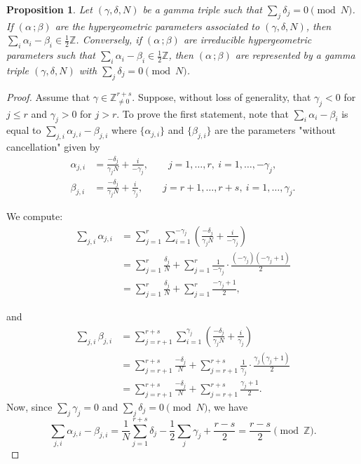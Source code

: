 \documentclass[11pt, reqno]{amsart}
\theoremstyle{plain}
\newtheorem{prop}[theo]{Proposition}
\theoremstyle{definition}
\newcommand{\Z}{\mathbb{Z}}
\newcommand{\ga}{\gamma}
\newcommand{\be}{\beta}
\newcommand{\al}{\alpha}
\begin{document}
\begin{prop}\label{prop:characterization-of-gamma-triple}
Let $(\gamma,\delta,N)$ be a gamma triple such that $\sum_{j} \delta_j =0 \pmod{N}$. If $(\al \,;\be)$ are the hypergeometric parameters associated to $(\gamma,\delta,N)$, then $\sum_{i} \al_i - \be_i \in \frac{1}{2} \Z$. 
Conversely, if $(\al \,;\be)$ are irreducible hypergeometric parameters such that $\sum_{i} \al_i - \be_i \in \frac{1}{2}\Z$, then $(\al \,;\be)$ are represented by a gamma triple $(\ga,\delta,N)$ with $\sum_{j} \delta_j=0 \pmod{N}$.
\end{prop}
\begin{proof}
Assume that $\ga \in \Z_{\neq0}^{r+s}$. Suppose, without loss of generality, that $\ga_j <0$ for $j\le r$ and $\ga_j> 0 $ for $j > r$.
To prove the first statement, note that $\sum_{i} \al_i - \be_i$ is equal to $\sum_{j,i} \al_{j,i}- \be_{j,i}$ where $\{\al_{j,i}\}$ and $\{\beta_{j,i}\}$ are the parameters "without cancellation" given by 
\begin{align*}
\al_{j,i} &= \frac{-\delta_j}{\ga_j N} + \frac{i}{-\ga_j}, \qquad j = 1,\dots,r, \ i = 1,\dots,-\ga_j, \\
\be_{j,i} &= \frac{-\delta_j}{\ga_j N} + \frac{i}{\ga_j}, \qquad j = r+1,\dots,r+s, \ i = 1,\dots,\ga_j.
\end{align*}


We compute:
\begin{align*}
    \sum_{j,i} \al_{j,i} &= \sum_{j=1}^r \sum_{i=1}^{-\ga_j} \left( \frac{-\delta_j}{\ga_j N} + \frac{i}{-\ga_j} \right) \\
    &= \sum_{j=1}^r \frac{\delta_j}{N} + \sum_{j=1}^r \frac{1}{-\ga_j} \cdot \frac{(-\ga_j)(-\ga_j + 1)}{2} \\
    &= \sum_{j=1}^r \frac{\delta_j}{N} + \sum_{j=1}^r \frac{-\ga_j + 1}{2},
\end{align*}

and
\begin{align*}
    \sum_{j,i} \be_{j,i} &= \sum_{j=r+1}^{r+s} \sum_{i=1}^{\ga_j} \left( \frac{-\delta_j}{\ga_j N} + \frac{i}{\ga_j} \right) \\
    &= \sum_{j=r+1}^{r+s} \frac{-\delta_j}{N} + \sum_{j=r+1}^{r+s} \frac{1}{\ga_j} \cdot \frac{\ga_j(\ga_j + 1)}{2} \\
    &= \sum_{j=r+1}^{r+s} \frac{-\delta_j}{N} + \sum_{j=r+1}^{r+s} \frac{\ga_j + 1}{2}.
\end{align*}
Now, since $\sum_j \ga_j = 0$ and $\sum_j \delta_j = 0 \pmod{N}$, we have
\[
\sum_{j,i} \al_{j,i} - \be_{j,i} = \frac{1}{N} \sum_{j=1}^{r+s} \delta_j - \frac{1}{2} \sum_j \ga_j + \frac{r - s}{2} = \frac{r - s}{2} \pmod {\Z}.
\]


\end{proof}
\end{document}
